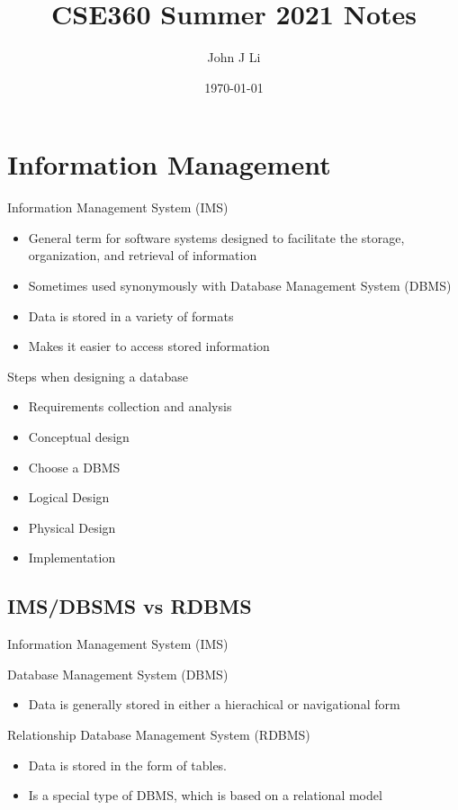 \documentclass{article}
\title{CSE360 Summer 2021 Notes}
\date{\today}
\author{John J Li}
\begin{document}
    \section*{Information Management}

    Information Management System (IMS)
    \begin{itemize}
        \item General term for software systems designed to facilitate the storage, organization, and retrieval of information
        \item Sometimes used synonymously with Database Management System (DBMS)
        \item Data is stored in a variety of formats
        \item Makes it easier to access stored information
    \end{itemize}

    Steps when designing a database
    \begin{itemize}
        \item Requirements collection and analysis
        \item Conceptual design
        \item Choose a DBMS
        \item Logical Design
        \item Physical Design
        \item Implementation
    \end{itemize}

    \subsection*{IMS/DBSMS vs RDBMS}

    Information Management System (IMS)
    
    Database Management System (DBMS)
    \begin{itemize}
        \item Data is generally stored in either a hierachical or navigational form 
    \end{itemize}

    Relationship Database Management System (RDBMS)
    \begin{itemize}
        \item Data is stored in the form of tables.
        \item Is a special type of DBMS, which is based on a relational model
    \end{itemize}
\end{document}
